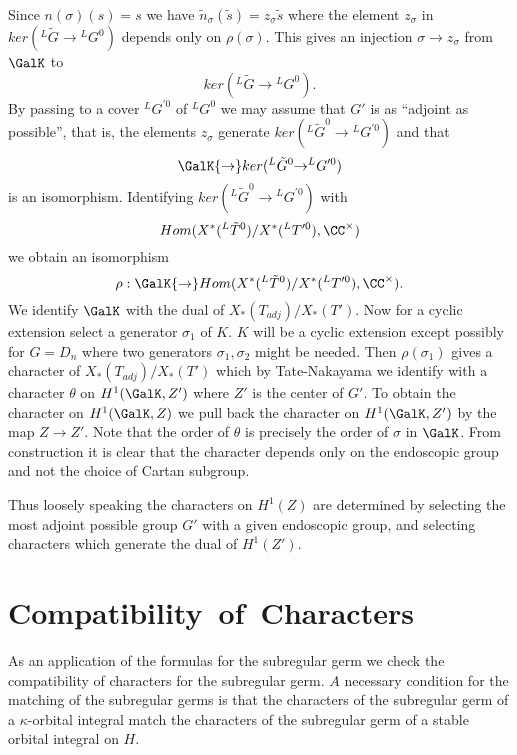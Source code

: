 \documentclass{memo-l}
\theoremstyle{definition}
\theoremstyle{remark}
\numberwithin{section}{chapter}
\numberwithin{equation}{chapter}
\begin{document}
   Since $n({\sigma})(s) = s$ we have $\tilde n _{{\sigma}}(\tilde s)
= z_{{\sigma}}\tilde s $ where the element $z_{{\sigma}}$ in
$ker({}^{L}\tilde G {\to} {}^{L}G^{0})$ depends only on ${\rho }({\sigma})$.
This gives an injection ${\sigma} {\to} z_{{\sigma}}$ from $\GalK$ to
$$ker({}^{L}\tilde G {\to} {}^{L}G^{0}).$$  By passing to a cover ${}^{L}G^{\prime0}$ of
${}^{L}G^{0}$ we may assume that $G'$ is as ``adjoint as possible'', that is,
the elements $z_{{\sigma}}$ generate $ker({}^{L}\tilde G^{0} \to
{}^{L}G^{\prime0})$ and that $$\GalK {\to} ker({}^{L}\tilde G ^{0} {\to}
{}^{L}G^{\prime0})$$ is an isomorphism.  Identifying $ker({}^{L} \tilde G ^{0} {\to}
{}^{L}G^{\prime0})$ with $$Hom(X^{*}({}^{L}\tilde T ^{0})/X^{*}({}^{L}T^{\prime0}),
{\CC}^{\times})$$ we obtain an isomorphism
$${\rho }:\GalK {\to}
Hom(X^{*}({}^{L}\tilde T ^{0})/X^{*}({}^{L}T^{\prime0}),
{\CC}^{\times}).$$  We
identify $\GalK$ with the dual of $X_{*}(T_{adj})/X_{*}(T')$.  Now for a cyclic
extension
select a generator ${\sigma}_{1}$ of $K$.  $K$ will be a cyclic extension
except possibly for $G = D_{n}$ where two generators
${\sigma}_{1},{\sigma}_{2}$ might be needed.  Then ${\rho }({\sigma}_{1})$
gives a character of $X_{*}(T_{adj})/X_{*}(T')$ which by Tate-Nakayama we
identify with a character ${\theta}$ on $H^{1}(\GalK,Z')$ where $Z'$ is
the center of $G'$.  To obtain the character on $H^{1}(\GalK,Z)$ we pull
back the character on $H^{1}(\GalK,Z')$ by the map $Z {\to} Z'$.  Note
that the order of ${\theta}$ is precisely the order of ${\sigma}$ in
$\GalK$.  From construction it is clear that the character depends only
on the endoscopic group and not the choice of Cartan subgroup.

   Thus loosely speaking the characters on $H^{1}(Z)$ are determined by
selecting the most adjoint possible group $G'$ with a given endoscopic
group, and selecting characters which generate the dual of $H^{1}(Z')$.




\section{Compatibility\ of\ Characters}

   As an application of the formulas for the subregular germ we check the
compatibility of characters for the subregular germ.  $A$ necessary
condition for the matching of the subregular germs is that the characters
of the subregular germ of a ${\kappa}$-orbital integral match the
characters of the subregular germ of a stable orbital integral on $H$.
\end{document}
